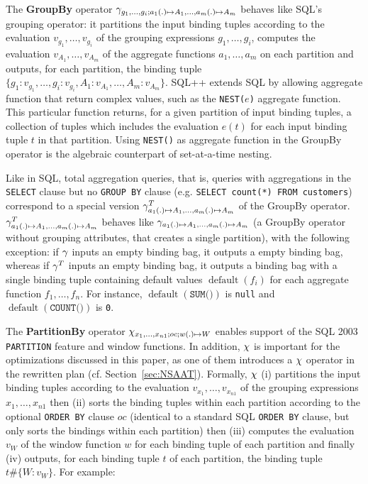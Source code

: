 The \textbf{GroupBy} operator $\gamma_{g_1,\ldots,g_i; a_1(.) \mapsto A_1, \ldots, a_m(.) \mapsto A_m}$ behaves like SQL's grouping operator: it partitions the input binding tuples according to the evaluation $v_{g_1},\ldots, v_{g_i}$ of the grouping expressions $g_1,\ldots,g_i$, computes the evaluation $v_{A_1},\ldots,v_{A_m}$ of the aggregate functions $a_1,\ldots,a_m$ on each partition and outputs, for each partition, the binding tuple $\{g_1: v_{g_1}, \ldots, g_i: v_{g_i}, A_1: v_{A_1}, \ldots, A_m: v_{A_m}\}$. SQL++ extends SQL by allowing aggregate function that return complex values, such as the \texttt{NEST(}$e$\texttt{)} aggregate function. This particular function returns, for a given partition of input binding tuples, a collection of tuples which includes the evaluation $e(t)$ for each input binding tuple $t$ in that partition. Using \texttt{NEST()} as aggregate function in the GroupBy operator is the algebraic counterpart of set-at-a-time nesting. 

Like in SQL, total aggregation queries, that is, queries with aggregations in the \texttt{SELECT} clause but no \texttt{GROUP BY} clause (e.g. \texttt{SELECT count(*) FROM customers}) correspond to a special version $\gamma^T_{a_1(.) \mapsto A_1, \ldots, a_m(.) \mapsto A_m}$ of the GroupBy operator. $\gamma^T_{a_1(.) \mapsto A_1, \ldots, a_m(.) \mapsto A_m}$ behaves like $\gamma_{a_1(.) \mapsto A_1, \ldots, a_m(.) \mapsto A_m}$ (a GroupBy operator without grouping attributes, that creates a single partition), with the following exception: if $\gamma$ inputs an empty binding bag, it outputs a empty binding bag, whereas if $\gamma^T$ inputs an empty binding bag, it outputs a binding bag with a single binding tuple containing default values $\operatorname{default}(f_i)$ for each aggregate function $f_1, \ldots, f_n$. For instance, $\operatorname{default}(\texttt{SUM()})$ is \texttt{null} and $\operatorname{default}(\texttt{COUNT()})$ is \texttt{0}.

The \textbf{PartitionBy} operator $\chi_{x_1,\dots,x_{n1}; oc; w(.) \mapsto W}$ enables support of the SQL 2003  \texttt{PARTITION} feature and window functions. In addition, $\chi$ is important for the optimizations discussed in this paper, as one of them introduces a $\chi$ operator in the rewritten plan (cf. Section~\ref{sec:NSAAT}). Formally, $\chi$ (i) partitions the input binding tuples according to the evaluation $v_{x_1},\ldots,v_{x_{n1}}$ of the grouping expressions $x_1,\ldots,x_{n1}$ then (ii) sorts the binding tuples within each partition according to the optional \texttt{ORDER BY} clause $oc$ (identical to a standard SQL \texttt{ORDER BY} clause, but only sorts the bindings within each partition) then (iii) computes the evaluation $v_W$ of the window function $w$ for each binding tuple of each partition and finally (iv) outputs, for each binding tuple $t$ of each partition, the binding tuple $t\#\{W: v_W\}$. For example:

